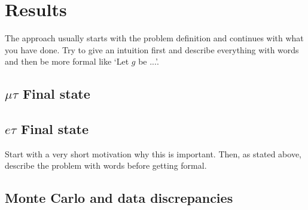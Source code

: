 \chapter{Results}\label{chap5}
The approach usually starts with the problem definition and continues with what you have done. Try to give an intuition first and describe everything with words and then be more formal like `Let $g$ be ...'.
\section{$\mu\tau$ Final state}
\section{$e\tau$ Final state}
Start with a very short motivation why this is important. Then, as stated above, describe the problem with words before getting formal.

\section{Monte Carlo and data discrepancies}

